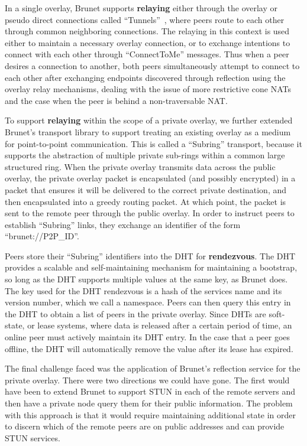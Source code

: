 \documentclass[conference]{IEEEtran}
\begin{document}
In a single overlay, Brunet supports \textbf{relaying} either through the
overlay or pseudo direct connections called ``Tunnels''~\cite{hpdc08_0}, where
peers route to each other through common neighboring connections.  The relaying
in this context is used either to maintain a necessary overlay connection, or
to exchange intentions to connect with each other through ``ConnectToMe''
messages.  Thus when a peer desires a connection to another, both peers
simultaneously attempt to connect to each other after exchanging endpoints
discovered through reflection using the overlay relay mechanisms, dealing with
the issue of more restrictive cone NATs and the case when the peer is behind a
non-traversable NAT.  

To support \textbf{relaying} within the scope of a private overlay, we further
extended Brunet's transport library to support treating an existing overlay
as a medium for point-to-point communication. This is called a ``Subring''
transport, because it supports the abstraction of multiple private sub-rings
within a common large structured ring.  When the private overlay transmits data
across the public overlay, the private overlay packet is encapsulated (and
possibly encrypted) in a packet that ensures it will be delivered to the
correct private destination, and then encapsulated into a greedy routing
packet.  At which point, the packet is sent to the remote peer through the
public overlay.  In order to instruct peers to establish ``Subring'' links,
they exchange an identifier of the form ``brunet://P2P\_ID''.

Peers store their ``Subring'' identifiers into the DHT for \textbf{rendezvous}.
The DHT provides a scalable and self-maintaining mechanism for maintaining a
bootstrap, so long as the DHT supports multiple values at the same key, as
Brunet does.  The key used for the DHT rendezvous is a hash of the services
name and its version number, which we call a namespace.  Peers can then query
this entry in the DHT to obtain a list of peers in the private overlay.  Since
DHTs are soft-state, or lease systems, where data is released after a certain
period of time, an online peer must actively maintain its DHT entry.  In the
case that a peer goes offline, the DHT will automatically remove the value
after its lease has expired.

The final challenge faced was the application of Brunet's reflection service
for the private overlay.  There were two directions we could have gone.  The
first would have been to extend Brunet to support STUN in each of the remote
servers and then have a private node query them for their public information.
The problem with this approach is that it would require maintaining additional
state in order to discern which of the remote peers are on public addresses and
can provide STUN services.
\end{document}
